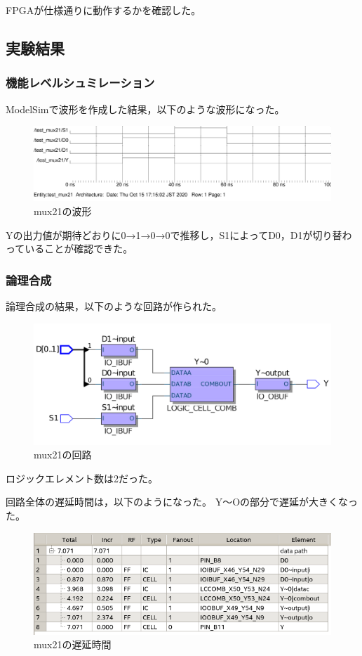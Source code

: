 FPGAが仕様通りに動作するかを確認した。

\subsection{実験結果}
\subsubsection{機能レベルシュミレーション}
ModelSimで波形を作成した結果，以下のような波形になった。

\begin{figure}[H]
  \centering
  \includegraphics[width=\linewidth]{./src/mux21/mux21_wave11.png}
  \caption{mux21の波形}
\end{figure}

Yの出力値が期待どおりに0→1→0→0で推移し，S1によってD0，D1が切り替わっていることが確認できた。

\subsubsection{論理合成}
論理合成の結果，以下のような回路が作られた。

\begin{figure}[H]
  \centering
  \includegraphics[width=\linewidth]{./src/mux21/mux21_print.png}
  \caption{mux21の回路}
\end{figure}

ロジックエレメント数は2だった。

回路全体の遅延時間は，以下のようになった。
Y～Oの部分で遅延が大きくなった。

\begin{figure}[H]
  \centering
  \includegraphics[width=\linewidth]{./src/mux21/mux21Timing.png}
  \caption{mux21の遅延時間}
\end{figure}

